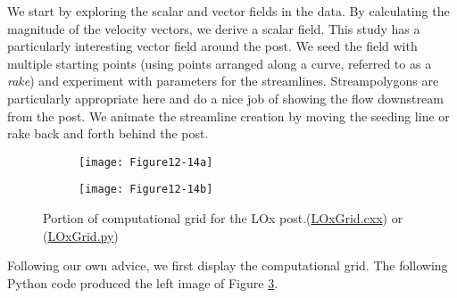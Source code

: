 We start by exploring the scalar and vector fields in the data. By calculating the magnitude of the velocity vectors, we derive a scalar field. This study has a particularly interesting vector field around the post. We seed the field with multiple starting points (using points arranged along a curve, referred to as a \emph{rake}) and experiment with parameters for the streamlines. Streampolygons are particularly appropriate here and do a nice job of showing the flow downstream from the post. We animate the streamline creation by moving the seeding line or rake back and forth behind the post.

\begin{figure}[htb]
    \begin{subfigure}[h]{0.48\linewidth}
        \texttt{[image: Figure12-14a]}
        \caption*{}
        \label{fig:Figure12-14a}
    \end{subfigure}
    \hfill
    \begin{subfigure}[h]{0.48\linewidth}
        \texttt{[image: Figure12-14b]}
        \caption*{}
        \label{fig:Figure12-14b}
    \end{subfigure}
    \caption{Portion of computational grid for the LOx post.(\href{https://lorensen.github.io/VTKExamples/site/Cxx/VisualizationAlgorithms/LOxGrid/}{LOxGrid.cxx}) or (\href{https://lorensen.github.io/VTKExamples/site/Python/VisualizationAlgorithms/LOxGrid/}{LOxGrid.py})}\label{fig:Figure12-14}
\end{figure}

Following our own advice, we first display the computational grid. The
following Python code produced the left image of Figure \ref{fig:Figure12-14}.

